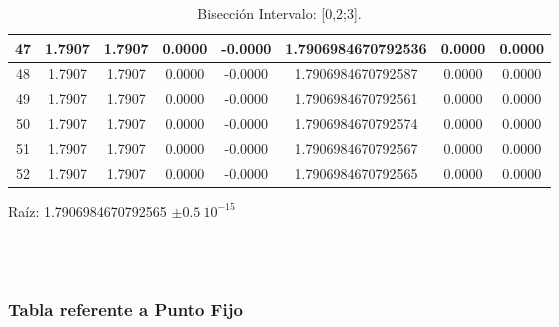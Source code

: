 \documentclass[10pt,a4paper]{article}
\begin{document}
\begin{table}[H]
{\begin{tabular}{|c|c|c|c|c|c|c|c|}
\hline 47 & 1.7907 & 1.7907 & 0.0000 & -0.0000 & 1.7906984670792536 & 0.0000 & 0.0000 \\
\hline 48 & 1.7907 & 1.7907 & 0.0000 & -0.0000 & 1.7906984670792587 & 0.0000 & 0.0000 \\
\hline 49 & 1.7907 & 1.7907 & 0.0000 & -0.0000 & 1.7906984670792561 & 0.0000 & 0.0000 \\
\hline 50 & 1.7907 & 1.7907 & 0.0000 & -0.0000 & 1.7906984670792574 & 0.0000 & 0.0000 \\
\hline 51 & 1.7907 & 1.7907 & 0.0000 & -0.0000 & 1.7906984670792567 & 0.0000 & 0.0000 \\
\hline 52 & 1.7907 & 1.7907 & 0.0000 & -0.0000 & 1.7906984670792565 & 0.0000 & 0.0000 \\
\hline
\end{tabular}}
\caption{Bisección Intervalo: [0,2;3].}
\end{table}
Raíz: 1.7906984670792565 $\pm 0.5\:10^{-15}$


~\\ %
~\\ 

\subsubsection{Tabla referente a Punto Fijo}
\end{document}

